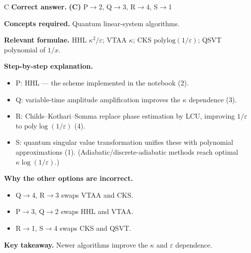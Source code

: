 \documentclass[11pt,a4paper]{article}
\newcommand{\qsep}{\par\vspace{2pt}{\color{black!15}\hrule}\vspace{4pt}}
\begin{document}
\begin{solbox}{C}
\textbf{\color{brand}Correct answer.} \textcolor{okgreen}{\textbf{(C)}} P$\to$2, Q$\to$3, R$\to$4, S$\to$1

\textbf{\color{brand}Concepts required.} Quantum linear-system algorithms.

\textbf{\color{brand}Relevant formulae.} HHL $\kappa^2/\varepsilon$; VTAA $\kappa$; CKS $\mathrm{polylog}(1/\varepsilon)$; QSVT polynomial of $1/x$.

\textbf{\color{brand}Step-by-step explanation.} \begin{itemize}\itemsep0pt
\item P: HHL --- the scheme implemented in the notebook (2).
\item Q: variable-time amplitude amplification improves the $\kappa$ dependence (3).
\item R: Childs--Kothari--Somma replace phase estimation by LCU, improving $1/\varepsilon$ to $\mathrm{poly}\log(1/\varepsilon)$ (4).
\item S: quantum singular value transformation unifies these with polynomial approximations (1). (Adiabatic/discrete-adiabatic methods reach optimal $\kappa\log(1/\varepsilon)$.)
\end{itemize}

\textbf{\color{brand}Why the other options are incorrect.}
\begin{itemize}[leftmargin=2.4em, itemsep=1pt, topsep=2pt]
\item[\textbf{(A)}] Q$\to$4, R$\to$3 swaps VTAA and CKS.
\item[\textbf{(B)}] P$\to$3, Q$\to$2 swaps HHL and VTAA.
\item[\textbf{(D)}] R$\to$1, S$\to$4 swaps CKS and QSVT.
\end{itemize}
\textbf{\color{brand}Key takeaway.} Newer algorithms improve the $\kappa$ and $\varepsilon$ dependence.
\end{solbox}
\qsep
\end{document}
